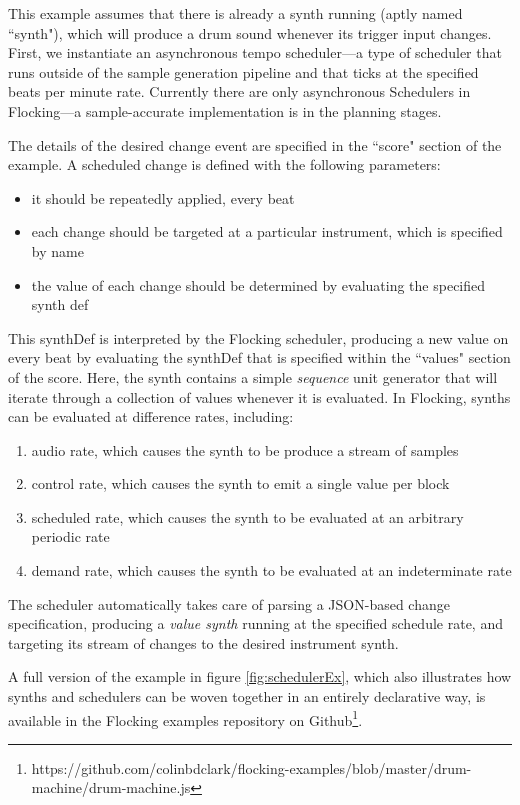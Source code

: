 \documentclass{article}
\begin{document}
This example assumes that there is already a synth running (aptly named ``synth"), which will produce a drum sound whenever its trigger input changes. First, we instantiate an asynchronous tempo scheduler---a type of scheduler that runs outside of the sample generation pipeline and that ticks at the specified beats per minute rate. Currently there are only asynchronous Schedulers in Flocking---a sample-accurate implementation is in the planning stages.

The details of the desired change event are specified in the ``score" section of the example. A scheduled change is defined with the following parameters:

\begin{itemize}
\item it should be repeatedly applied, every beat
\item each change should be targeted at a particular instrument, which is specified by name
\item the value of each change should be determined by evaluating the specified synth def
\end{itemize}

This synthDef is interpreted by the Flocking scheduler, producing a new value on every beat by evaluating the synthDef that is specified within the ``values" section of the score. Here, the synth contains a simple {\it sequence} unit generator that will iterate through a collection of values whenever it is evaluated. In Flocking, synths can be evaluated at difference rates, including:

\begin{enumerate}
\item audio rate, which causes the synth to be produce a stream of samples
\item control rate, which causes the synth to emit a single value per block
\item scheduled rate, which causes the synth to be evaluated at an arbitrary periodic rate
\item demand rate, which causes the synth to be evaluated at an indeterminate rate
\end{enumerate}

The scheduler automatically takes care of parsing a JSON-based change specification, producing a {\it value synth} running at the specified schedule rate, and targeting its stream of changes to the desired instrument synth.

A full version of the example in figure \ref{fig:schedulerEx}, which also illustrates how synths and schedulers can be woven together in an entirely declarative way, is available in the Flocking examples repository on Github\footnote{https://github.com/colinbdclark/flocking-examples/blob/master/drum-machine/drum-machine.js}.
\end{document}
